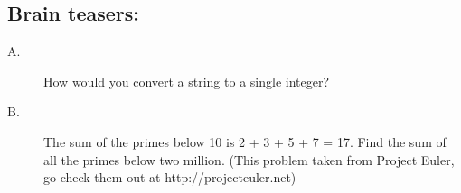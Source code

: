 \documentclass{article}
\begin{document}
\subsection*{Brain teasers:}
\begin{description}
\item[A.] How would you convert a string to a single integer? %

\item[B.] The sum of the primes below 10 is 2 + 3 + 5 + 7 = 17. Find the sum of all the primes below two million. (This problem taken from Project Euler, go check them out at http://projecteuler.net) %

\end{description}
\end{document}
